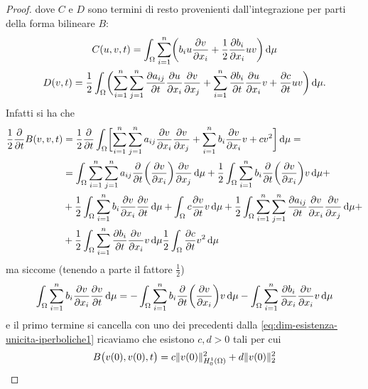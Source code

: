 \begin{proof}
    dove $C$ e $D$ sono termini di resto provenienti dall'integrazione per parti della forma bilineare $B$:
    \begin{equation}
        \begin{gathered}
            C(u,v,t)=\int_\Omega\sum_{i=1}^n\biggl(b_iu\drp{v}{x_i}+\frac12\drp{b_i}{x_i}uv\biggr)\,\dd\mu\\
            D(v,t)=\frac12\int_\Omega\biggl(\sum_{i=1}^n\sum_{j=1}^n\drp{a_{ij}}{t}\drp{u}{x_i}\drp{v}{x_j}+\sum_{i=1}^n\drp{b_i}{t}\drp{u}{x_i}v+\drp{c}{t}uv\biggr)\,\dd\mu.
        \end{gathered}
    \end{equation}
    Infatti si ha che
    \begin{equation}
        \begin{split}
            \frac12\drp{}{t}B(v,v,t)&=
            \frac12\drp{}{t}\int_\Omega\biggl[\sum_{i=1}^n\sum_{j=1}^na_{ij}\drp{v}{x_i}\drp{v}{x_j}+\sum_{i=1}^nb_i\drp{v}{x_i}v+cv^2\biggr]\,\dd\mu=\\ &=
                \int_\Omega\sum_{i=1}^n\sum_{j=1}^na_{ij}\drp{}{t}\biggl(\drp{v}{x_i}\biggr)\drp{v}{x_j}\,\dd\mu+
                \frac12\int_\Omega\sum_{i=1}^nb_i\drp{}{t}\biggl(\drp{v}{x_i}\biggr)v\,\dd\mu+\\ &+
                \frac12\int_\Omega\sum_{i=1}^nb_i\drp{v}{x_i}\drp{v}{t}\,\dd\mu+
                \int_\Omega c\drp{v}{t}v\,\dd\mu+
                \frac12\int_\Omega\sum_{i=1}^n\sum_{j=1}^n\drp{a_{ij}}{t}\drp{v}{x_i}\drp{v}{x_j}\,\dd\mu+\\ &+
                \frac12\int_\Omega\sum_{i=1}^n\drp{b_i}{t}\drp{v}{x_i}v\,\dd\mu
                \frac12\int_\Omega\drp{c}{t}v^2\,\dd\mu
        \end{split}
        \label{eq:dim-esistenza-unicita-iperboliche1}
    \end{equation}
    ma siccome (tenendo a parte il fattore $\frac12$)
    \begin{equation}
        \int_\Omega\sum_{i=1}^nb_i\drp{v}{x_i}\drp{v}{t}\,\dd\mu=
        -\int_\Omega\sum_{i=1}^nb_i\drp{}{t}\biggl(\drp{v}{x_i}\biggr)v\,\dd\mu-\int_\Omega\sum_{i=1}^n\drp{b_i}{x_i}\drp{v}{x_i}v\,\dd\mu
    \end{equation}
    e il primo termine si cancella con uno dei precedenti dalla \eqref{eq:dim-esistenza-unicita-iperboliche1} ricaviamo che esistono $c,d>0$ tali per cui
    \begin{equation}
        B\bigl(v(0),v(0),t\bigr)=c\norm{v(0)}_{\sobHc[1]{\Omega}}^2+d\norm{v(0)}_2^2
    \end{equation}

\end{proof}
